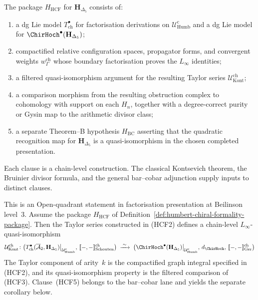 \begin{definition}
\label{def:humbert-chiral-formality-package}
The package $H_{\mathrm{HCF}}$ for $\mathbf H_{\Delta_5}$ consists of:
\begin{enumerate}[label=\textup{(HCF\arabic*)},leftmargin=*]
\item a dg Lie model $T^\bullet_{\mathrm{ch}}$ for factorisation
derivations on $\mathcal U_{\mathrm{Humb}}^{\mathrm c}$ and a dg Lie
model for $\ChirHoch^\bullet(\mathbf H_{\Delta_5})$;
\item compactified relative configuration spaces, propagator forms,
and convergent weights $w^{\mathrm{ch}}_\Gamma$ whose boundary
factorisation proves the $L_\infty$ identities;
\item a filtered quasi-isomorphism argument for the resulting Taylor
series $\mathcal U^{\mathrm{ch}}_{\mathrm{Kont}}$;
\item a comparison morphism from the resulting obstruction complex to
cohomology with support on each $H_n$, together with a degree-correct
purity or Gysin map to the arithmetic divisor class;
\item a separate Theorem--B hypothesis $H_{\mathrm{BC}}$ asserting that
the quadratic recognition map for $\mathbf H_{\Delta_5}$ is a
quasi-isomorphism in the chosen completed presentation.
\end{enumerate}
Each clause is a chain-level construction.  The classical Kontsevich
theorem, the Bruinier divisor formula, and the general bar--cobar
adjunction supply inputs to distinct clauses.
\end{definition}

\begin{theorem}
\label{thm:chiral-kontsevich-formality}
\ClaimStatusConditional
{}%
This is an Open-quadrant statement in factorisation presentation at
Beilinson level~$3$.  Assume the package $H_{\mathrm{HCF}}$
of Definition~\ref{def:humbert-chiral-formality-package}.  Then the
Taylor series constructed in \textup{(HCF2)} defines a chain-level
$L_\infty$-quasi-isomorphism
\begin{equation}
\label{eq:chiral-kontsevich-formality-map}
\mathcal U^{\mathrm{ch}}_{\mathrm{Kont}}\colon
\bigl(T^\bullet_{\mathrm{ch}}
(\overline{\mathcal A}_2,\mathbf H_{\Delta_5})
\big|_{\mathcal U_{\mathrm{Humb}}^{\mathrm{c}}},\,
[\![-,-]\!]_{\mathrm{Schouten}}^{\mathrm{ch}}\bigr)
\;\xrightarrow{\;\sim\;}\;
\bigl(\ChirHoch^\bullet(\mathbf H_{\Delta_5})
\big|_{\mathcal U_{\mathrm{Humb}}^{\mathrm{c}}},\,
d_{\ChirHoch},\,
[\![-,-]\!]_{\mathrm{Ger}}^{\mathrm{ch}}\bigr)
\end{equation}
The Taylor component of arity~$k$ is the compactified graph integral
specified in \textup{(HCF2)}, and its quasi-isomorphism property is the
filtered comparison of \textup{(HCF3)}.  Clause~\textup{(HCF5)} belongs
to the bar--cobar lane and yields the separate corollary below.
\end{theorem}

